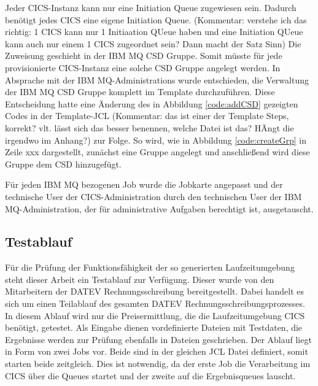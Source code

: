 Jeder CICS-Instanz kann nur eine Initiation Queue zugewiesen sein.
Dadurch benötigt jedes CICS eine eigene Initiation Queue. (Kommentar: verstehe ich das richtig: 1 CICS kann nur 1 Initiaation QUeue haben und eine Initiation QUeue kann auch nur einem 1 CICS zugeordnet sein? Dann macht der Satz Sinn)
Die Zuweisung geschieht in der IBM MQ CSD Gruppe.
Somit müsste für jede provisionierte CICS-Instanz eine solche CSD Gruppe angelegt werden.
In Absprache mit der IBM MQ-Administrations  wurde entschieden, die Verwaltung der IBM MQ CSD Gruppe komplett im Template durchzuführen.
Diese Entscheidung hatte eine Änderung des in Abbildung \ref{code:addCSD} gezeigten Codes in der Template-JCL (Kommentar: das ist einer der Template Steps, korrekt? vlt. lässt sich das besser benennen, welche Datei ist das? HÄngt die irgendwo im Anhang?) zur Folge.
So wird, wie in Abbildung \ref{code:createGrp} in Zeile xxx dargestellt, zunächst eine Gruppe angelegt und anschließend wird diese Gruppe dem CSD hinzugefügt.

\begin{minipage}{\linewidth}

\end{minipage}

Für jeden IBM MQ bezogenen Job wurde die Jobkarte angepasst und der technische User der CICS-Administration durch den technischen User der IBM MQ-Administration, der für administrative Aufgaben berechtigt ist, ausgetauscht.

\subsection{Testablauf}
Für die Prüfung der Funktionsfähigkeit der so generierten Laufzeitumgebung steht dieser Arbeit ein Testablauf zur Verfügung.
Dieser wurde von den Mitarbeitern der DATEV Rechnungsschreibung bereitgestellt.
Dabei handelt es sich um einen Teilablauf des gesamten DATEV Rechnungsschreibungsprozesses.
In diesem Ablauf wird nur die Preisermittlung, die die Laufzeitumgebung CICS benötigt, getestet.
Als Eingabe dienen vordefinierte Dateien mit Testdaten, die Ergebnisse werden zur Prüfung ebenfalls in Dateien geschrieben.
Der Ablauf liegt in Form von zwei Jobs vor.
Beide sind in der gleichen JCL Datei definiert, somit starten beide zeitgleich. 
Dies ist notwendig, da der erste Job die Verarbeitung im CICS über die Queues startet und der zweite auf die Ergebnisqueues lauscht.

